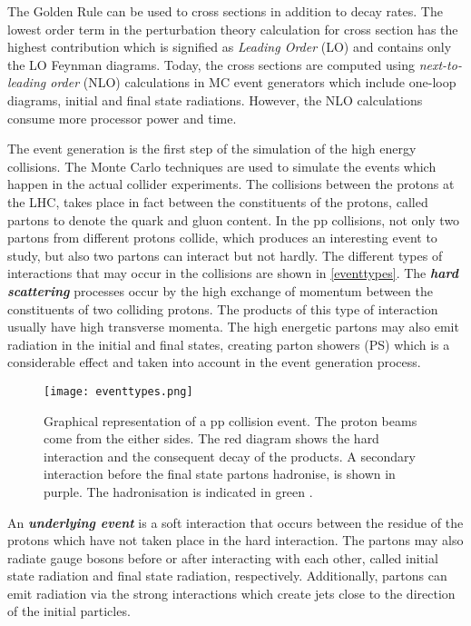 The Golden Rule can be used to cross sections in addition to decay rates. The lowest order term in the perturbation theory calculation for cross section has the highest contribution which is signified as \emph{Leading Order} (LO) and contains only the LO Feynman diagrams. Today, the cross sections are computed using \emph{next-to-leading order} (NLO) calculations in MC event generators which include one-loop diagrams, initial and final state radiations. However, the NLO calculations consume more processor power and time. 

The event generation is the first step of the simulation of the high energy collisions. The Monte Carlo techniques are used to simulate the events which happen in the actual collider experiments. The collisions between the protons at the LHC, takes place in fact between the constituents of the protons, called partons to denote the quark and gluon content. In the pp collisions, not only two partons from different protons collide, which produces an interesting event to study, but also two partons can interact but not hardly. The different types of interactions that may occur in the collisions are shown in \autoref{eventtypes}. The \emph{\bf{hard scattering}} processes occur by the high exchange of momentum between the constituents of two colliding protons. The products of this type of interaction usually have high transverse momenta. The high energetic partons may also emit radiation in the initial and final states, creating parton showers (PS) which is a considerable effect and taken into account in the event generation process.

\begin{figure}[ht]
	\centering
	\texttt{[image: eventtypes.png]}
	\vspace{2mm}
	\caption[Graphical representation of a pp collision event. The proton beams come from the either sides. The red diagram shows the hard interaction and the consequent decay of the products. A secondary interaction before the final state partons hadronise, is shown in purple. The hadronisation is indicated in green.]
	{Graphical representation of a pp collision event. The proton beams come from the either sides. The red diagram shows the hard interaction and the consequent decay of the products. A secondary interaction before the final state partons hadronise, is shown in purple. The hadronisation is indicated in green \cite{Pttgen2016}.}
	\label{eventtypes}
\end{figure}

An \emph{\bf{underlying event}} is a soft interaction that occurs between the residue of the protons which have not taken place in the hard interaction. The partons may also radiate gauge bosons before or after interacting with each other, called initial state radiation and final state radiation, respectively. Additionally, partons can emit radiation via the strong interactions which create jets close to the direction of the initial particles.

